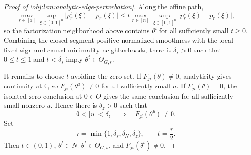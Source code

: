 \begin{proof}[Proof of \cref{obj:lem:analytic-edge-perturbation}]
Along the affine path,
\[
\max_{r\in[n]}\sup_{\xi\in[0,1]^n}
\bigl|p_r^t(\xi)-p_r(\xi)\bigr|
\le
 t\max_{r\in[n]}\sup_{\xi\in[0,1]^n}
\bigl|p_r^\star(\xi)-p_r(\xi)\bigr|,
\]
so the factorization neighborhood above contains \(\theta^t\) for all sufficiently small \(t\ge0\).  Combining the closed-segment positive normalized smoothness with the local fixed-sign and causal-minimality neighborhoods, there is \(\delta_s>0\) such that \(0\le t\le1\) and \(t<\delta_s\) imply \(\theta^t\in\Theta_{G,s}\). %

It remains to choose \(t\) avoiding the zero set.  If \(F_{ji}(\theta)\ne0\), analyticity gives continuity at \(0\), so \(F_{ji}(\theta^u)\ne0\) for all sufficiently small \(u\).  If \(F_{ji}(\theta)=0\), the isolated-zero conclusion at \(0\in O\) gives the same conclusion for all sufficiently small nonzero \(u\).  Hence there is \(\delta_z>0\) such that
\[
0<|u|<\delta_z
\quad\Longrightarrow\quad
F_{ji}(\theta^u)\ne0 .
\]
Set
\[
r=\min\{1,\delta_s,\delta_N,\delta_z\},\qquad t=\frac r2 .
\]
Then \(t\in(0,1)\), \(\theta^t\in N\), \(\theta^t\in\Theta_{G,s}\), and \(F_{ji}(\theta^t)\ne0\). %
\end{proof}
